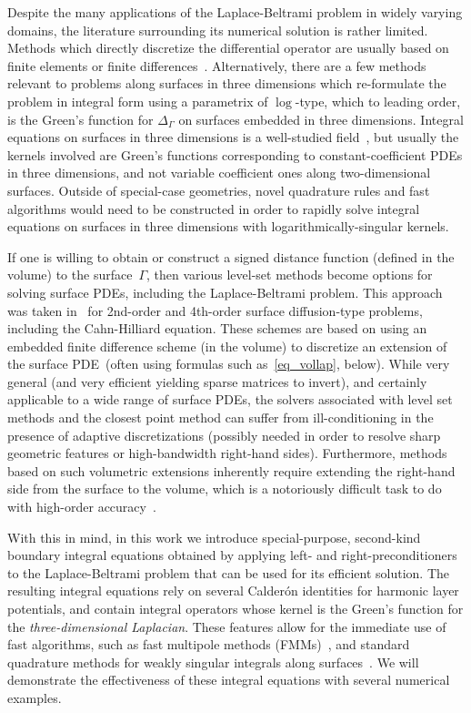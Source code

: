 \documentclass[11pt]{article}
\newcommand{\surflap}{\Delta_\Gamma}
\numberwithin{equation}{section}
\begin{document}
Despite the many applications of the Laplace-Beltrami
problem in widely varying
domains, the literature surrounding its numerical 
solution is rather limited.
Methods which directly discretize the differential operator are
usually based on finite elements or finite
differences~\cite{bonito_2013,
  hansbo_2016,demlow_2007,dziuk_2013,frittelli_2016}.
Alternatively, there are a
few methods~\cite{kropinski_2014_fast,kropinski_2016_integral}
relevant
to problems along surfaces in three dimensions which
re-formulate the problem in integral form using a parametrix of
$\log$-type, which to leading order, is the Green's function for
$\surflap$ on surfaces embedded in three dimensions.
Integral equations on surfaces in
three dimensions is a well-studied field~\cite{kress_2014}, but usually
the kernels involved are Green's functions corresponding to
constant-coefficient PDEs in
three dimensions, and not variable coefficient ones
along two-dimensional surfaces. Outside of
special-case geometries, novel quadrature rules and fast algorithms
would need to be constructed in order to rapidly solve integral
equations on surfaces in three dimensions with logarithmically-singular
kernels.

If one is willing to obtain or construct a signed distance function
(defined in the volume) to the surface~$\Gamma$, then various
level-set methods become options for solving surface PDEs, including
the Laplace-Beltrami problem. This approach was taken
in~\cite{bertalmio2001,greer2006,chen2015,macdonald2009,macdonald2008,ruuth2008} for
2nd-order and 4th-order surface diffusion-type problems, including the
Cahn-Hilliard equation. These schemes are based on using an embedded
finite difference scheme (in the volume) to discretize an extension of
the surface
PDE~(often using formulas such as~\eqref{eq_vollap}, below).
While very general (and very efficient yielding sparse matrices
to invert), and
certainly applicable to a wide range of surface PDEs, the
solvers associated with level set methods and the closest point method
can suffer from ill-conditioning in the presence of adaptive
discretizations (possibly needed in order to resolve sharp geometric
features or high-bandwidth right-hand sides).
Furthermore, methods based on such volumetric extensions inherently
require extending the right-hand side from the surface to the volume,
which is a notoriously difficult task to do with high-order
accuracy~\cite{askham2017}.


With this in mind, in this work we introduce special-purpose,
second-kind boundary
integral equations obtained by applying left- and
right-preconditioners to the Laplace-Beltrami problem that can be used
for its efficient solution. The resulting integral equations rely on
several Calder\'on identities for harmonic layer potentials, and
contain integral operators whose kernel is the Green's function for
the \emph{three-dimensional Laplacian}. These features allow for the
immediate use of fast algorithms, such as fast multipole methods
(FMMs)~\cite{greengard-1997}, and standard quadrature methods for
weakly singular integrals along
surfaces~\cite{bremer_2012c,bremer_2013}.  We will demonstrate the
effectiveness of these integral equations with several numerical
examples.
\end{document}
